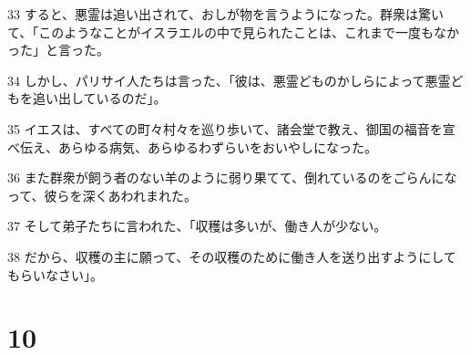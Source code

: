 \par 33 すると、悪霊は追い出されて、おしが物を言うようになった。群衆は驚いて、「このようなことがイスラエルの中で見られたことは、これまで一度もなかった」と言った。
\par 34 しかし、パリサイ人たちは言った、「彼は、悪霊どものかしらによって悪霊どもを追い出しているのだ」。
\par 35 イエスは、すべての町々村々を巡り歩いて、諸会堂で教え、御国の福音を宣べ伝え、あらゆる病気、あらゆるわずらいをおいやしになった。
\par 36 また群衆が飼う者のない羊のように弱り果てて、倒れているのをごらんになって、彼らを深くあわれまれた。
\par 37 そして弟子たちに言われた、「収穫は多いが、働き人が少ない。
\par 38 だから、収穫の主に願って、その収穫のために働き人を送り出すようにしてもらいなさい」。

\chapter{10}


